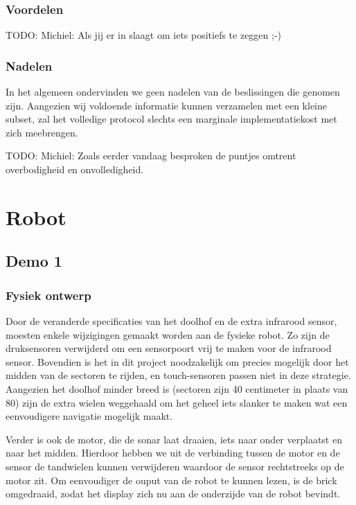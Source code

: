 \documentclass[12pt,a4paper]{report}
\begin{document}
\subsection{Voordelen}

TODO: Michiel: Als jij er in slaagt om iets positiefs te zeggen ;-)

\subsection{Nadelen}

In het algemeen ondervinden we geen nadelen van de beslissingen die genomen zijn. Aangezien wij voldoende informatie kunnen verzamelen met een kleine subset, zal het volledige protocol slechts een marginale implementatiekost met zich meebrengen.

TODO: Michiel: Zoals eerder vandaag besproken de puntjes omtrent overbodigheid en onvolledigheid.

\chapter{Robot}

\section{Demo 1}

\subsection{Fysiek ontwerp}

Door de veranderde specificaties van het doolhof en de extra infrarood sensor, moesten enkele wijzigingen gemaakt worden aan de fysieke robot. Zo zijn de druksensoren verwijderd om een sensorpoort vrij te maken voor de infrarood sensor. Bovendien is het in dit project noodzakelijk om precies mogelijk door het midden van de sectoren te rijden, en touch-sensoren passen niet in deze strategie. Aangezien het doolhof minder breed is (sectoren zijn 40 centimeter in plaats van 80) zijn de extra wielen weggehaald om het geheel iets slanker te maken wat een eenvoudigere navigatie mogelijk maakt.

Verder is ook de motor, die de sonar laat draaien, iets naar onder verplaatst en naar het midden. Hierdoor hebben we uit de verbinding tussen de motor en de sensor de tandwielen kunnen verwijderen waardoor de sensor rechtstreeks op de motor zit. Om eenvoudiger de ouput van de robot te kunnen lezen, is de brick omgedraaid, zodat het display zich nu aan de onderzijde van de robot bevindt.
\end{document}
